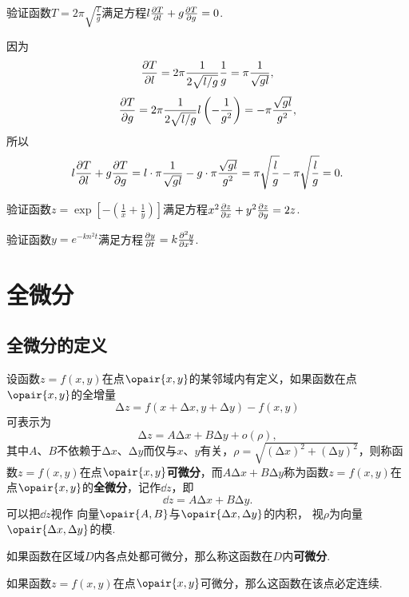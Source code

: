 \begin{example}
验证函数\(T = 2\pi\sqrt{\frac{l}{g}}\)满足方程\(l\pdv{T}{l}+g\pdv{T}{g}=0\).
\begin{solution}
因为\[
\pdv{T}{l} = 2\pi \frac{1}{2\sqrt{l/g}} \frac{1}{g}
= \pi \frac{1}{\sqrt{gl}},
\]\[
\pdv{T}{g} = 2\pi \frac{1}{2\sqrt{l/g}} l \left(-\frac{1}{g^2}\right)
= -\pi \frac{\sqrt{gl}}{g^2},
\]所以\[
l\pdv{T}{l}+g\pdv{T}{g}
= l \cdot \pi \frac{1}{\sqrt{gl}} - g \cdot \pi \frac{\sqrt{gl}}{g^2}
= \pi \sqrt{\frac{l}{g}} - \pi \sqrt{\frac{l}{g}} = 0.
\]
\end{solution}
\end{example}

\begin{example}
验证函数\(z = \exp[-\left(\frac{1}{x}+\frac{1}{y}\right)]\)满足方程\(x^2 \pdv{z}{x} + y^2 \pdv{z}{y} = 2z\).
\end{example}

\begin{example}
验证函数\(y = e^{-k n^2 t}\)满足方程\(\pdv{y}{t} = k \pdv[2]{y}{x}\).
\end{example}

\section{全微分}
\subsection{全微分的定义}
\begin{definition}
设函数\(z=f(x,y)\)在点\(\opair{x,y}\)的某邻域内有定义，如果函数在点\(\opair{x,y}\)的全增量\[
\increment z = f(x+\increment x,y+\increment y)-f(x,y)
\]可表示为\[
\increment z = A \increment x + B \increment y + o(\rho),
\]其中\(A\)、\(B\)不依赖于\(\increment x\)、\(\increment y\)而仅与\(x\)、\(y\)有关，\(\rho=\sqrt{(\increment x)^2+(\increment y)^2}\)，则称函数\(z=f(x,y)\)在点\(\opair{x,y}\)\textbf{可微分}，而\(A \increment x + B \increment y\)称为函数\(z=f(x,y)\)在点\(\opair{x,y}\)的\textbf{全微分}，记作\(\dd{z}\)，即\[
\dd{z} = A \increment x + B \increment y.
\]可以把\(\dd{z}\)视作%
向量\(\opair{A,B}\)与\(\opair{\increment x,\increment y}\)的内积，%
视\(\rho\)为向量\(\opair{\increment x,\increment y}\)的模.

如果函数在区域\(D\)内各点处都可微分，那么称这函数在\(D\)内\textbf{可微分}.
\end{definition}

\begin{theorem}
如果函数\(z=f(x,y)\)在点\(\opair{x,y}\)可微分，那么这函数在该点必定连续.
\end{theorem}

